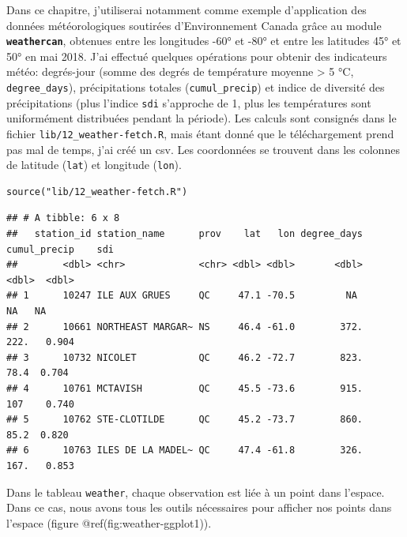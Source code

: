 \documentclass[]{book}
\newenvironment{Shaded}{\begin{snugshade}}{\end{snugshade}}
\newcommand{\KeywordTok}[1]{\textcolor[rgb]{0.13,0.29,0.53}{\textbf{#1}}}
\newcommand{\NormalTok}[1]{#1}
\newcommand{\OperatorTok}[1]{\textcolor[rgb]{0.81,0.36,0.00}{\textbf{#1}}}
\newcommand{\StringTok}[1]{\textcolor[rgb]{0.31,0.60,0.02}{#1}}
\begin{document}
Dans ce chapitre, j'utiliserai notamment comme exemple d'application des
données météorologiques soutirées d'Environnement Canada grâce au module
\textbf{\texttt{weathercan}}, obtenues entre les longitudes -60° et -80°
et entre les latitudes 45° et 50° en mai 2018. J'ai effectué quelques
opérations pour obtenir des indicateurs météo: degrés-jour (somme des
degrés de température moyenne \textgreater{} 5 °C,
\texttt{degree\_days}), précipitations totales (\texttt{cumul\_precip})
et indice de diversité des précipitations (plus l'indice \texttt{sdi}
s'approche de 1, plus les températures sont uniformément distribuées
pendant la période). Les calculs sont consignés dans le fichier
\texttt{lib/12\_weather-fetch.R}, mais étant donné que le téléchargement
prend pas mal de temps, j'ai créé un csv. Les coordonnées se trouvent
dans les colonnes de latitude (\texttt{lat}) et longitude
(\texttt{lon}).

\begin{verbatim}
source("lib/12_weather-fetch.R")
\end{verbatim}

\begin{Shaded}
\end{Shaded}

\begin{verbatim}
## # A tibble: 6 x 8
##   station_id station_name      prov    lat   lon degree_days cumul_precip    sdi
##        <dbl> <chr>             <chr> <dbl> <dbl>       <dbl>        <dbl>  <dbl>
## 1      10247 ILE AUX GRUES     QC     47.1 -70.5         NA          NA   NA    
## 2      10661 NORTHEAST MARGAR~ NS     46.4 -61.0        372.        222.   0.904
## 3      10732 NICOLET           QC     46.2 -72.7        823.         78.4  0.704
## 4      10761 MCTAVISH          QC     45.5 -73.6        915.        107    0.740
## 5      10762 STE-CLOTILDE      QC     45.2 -73.7        860.         85.2  0.820
## 6      10763 ILES DE LA MADEL~ QC     47.4 -61.8        326.        167.   0.853
\end{verbatim}

Dans le tableau \texttt{weather}, chaque observation est liée à un point
dans l'espace. Dans ce cas, nous avons tous les outils nécessaires pour
afficher nos points dans l'espace (figure @ref(fig:weather-ggplot1)).
\end{document}
